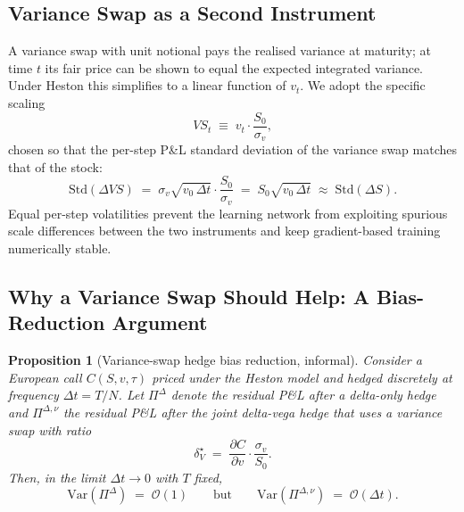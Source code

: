 \documentclass[11pt, a4paper]{article}
\newtheorem{proposition}{Proposition}
\begin{document}
\subsection{Variance Swap as a Second Instrument}
\label{sec:vs-defn}

A variance swap with unit notional pays the realised variance at maturity;
at time $t$ its fair price can be shown to equal the expected
integrated variance. Under Heston this simplifies to a linear function
of $v_t$. We adopt the specific scaling
\begin{equation}
    VS_t \;\equiv\; v_t \cdot \frac{S_0}{\sigma_v},
\end{equation}
chosen so that the per-step P\&L standard deviation of the variance swap
matches that of the stock:
\begin{equation}
    \mathrm{Std}(\Delta VS)
    \;=\; \sigma_v \sqrt{v_0\, \Delta t}\cdot \frac{S_0}{\sigma_v}
    \;=\; S_0 \sqrt{v_0\, \Delta t}
    \;\approx\; \mathrm{Std}(\Delta S).
\end{equation}
Equal per-step volatilities prevent the learning network from exploiting
spurious scale differences between the two instruments and keep
gradient-based training numerically stable.

\subsection{Why a Variance Swap Should Help: A Bias-Reduction Argument}
\label{sec:theory-prop}

\begin{proposition}[Variance-swap hedge bias reduction, informal]
\label{prop:bias}
Consider a European call $C(S, v, \tau)$ priced under the Heston model and
hedged discretely at frequency $\Delta t = T/N$.
Let $\Pi^\Delta$ denote the residual P\&L after a delta-only hedge and
$\Pi^{\Delta,\nu}$ the residual P\&L after the joint delta-vega hedge that
uses a variance swap with ratio
\begin{equation}
    \delta_V^\star \;=\; \frac{\partial C}{\partial v} \cdot \frac{\sigma_v}{S_0}.
    \label{eq:optimal-vega}
\end{equation}
Then, in the limit $\Delta t \to 0$ with $T$ fixed,
\[
    \mathrm{Var}(\Pi^\Delta) \;=\; \mathcal{O}(1)
    \qquad\text{but}\qquad
    \mathrm{Var}(\Pi^{\Delta,\nu}) \;=\; \mathcal{O}(\Delta t).
\]
\end{proposition}
\end{document}
